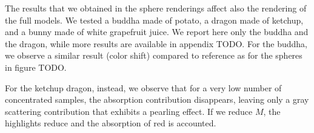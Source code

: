 The results that we obtained in the sphere renderings affect also the rendering of the full models. We tested a buddha made of potato, a dragon made of ketchup, and a bunny made of white grapefruit juice. We report here only the buddha and the dragon, while more results are available in appendix TODO. For the buddha, we observe a similar result (color shift) compared to reference as for the spheres in figure TODO.

For the ketchup dragon, instead, we observe that for a very low number of concentrated samples, the absorption contribution disappears, leaving only a gray scattering contribution that exhibits a pearling effect. If we reduce $M$, the highlights reduce and the absorption of red is accounted.


\begin{figure}
\centering
{}
\end{figure}
